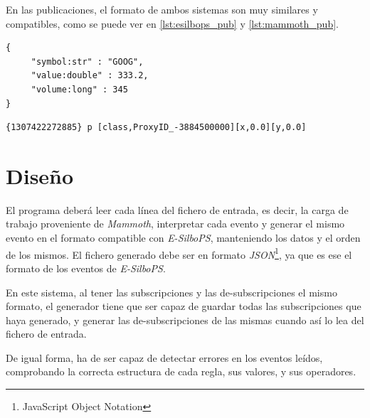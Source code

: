 En las publicaciones, el formato de ambos sistemas son muy similares y compatibles, como se puede ver
en \autoref{lst:esilbops_pub} y \autoref{lst:mammoth_pub}.

\begin{lstlisting}[caption={Ejemplo de publicación de E-SilboPS.},label={lst:esilbops_pub},style=consola,captionpos=b]
{
	 "symbol:str" : "GOOG",
	 "value:double" : 333.2,
	 "volume:long" : 345
}
\end{lstlisting}

\begin{lstlisting}[caption={Ejemplo de publicación de Mammoth.},label={lst:mammoth_pub},style=consola,captionpos=b]
{1307422272885} p [class,ProxyID_-3884500000][x,0.0][y,0.0]
\end{lstlisting}




\section{Diseño} \label{sct:desarrollo_diseno}

El programa deberá leer cada línea del fichero de entrada, es decir, la carga de trabajo
proveniente de \textit{Mammoth}, interpretar cada evento y generar el mismo evento en el formato 
compatible con \textit{E-SilboPS}, manteniendo los datos y el orden de los mismos. El fichero generado 
debe ser en formato \textit{JSON}\footnote{JavaScript Object Notation}, ya que es ese el
formato de los eventos de \textit{E-SilboPS}.

En este sistema, al tener las subscripciones y las de-subscripciones el mismo formato, el generador
tiene que ser capaz de guardar todas las subscripciones que haya generado, y generar las 
de-subscripciones de las mismas cuando así lo lea del fichero de entrada.

De igual forma, ha de ser capaz de detectar errores en los eventos leídos,
comprobando la correcta estructura de cada regla, sus valores, y sus operadores.



